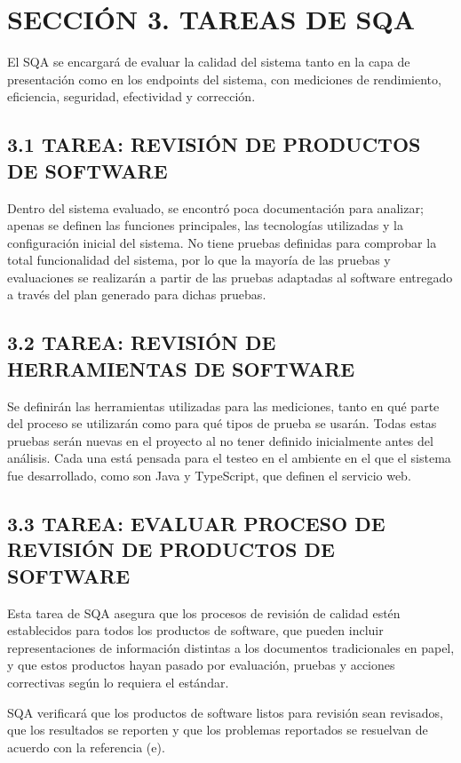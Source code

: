 ﻿\section{SECCIÓN 3. TAREAS DE SQA}
El SQA se encargará de evaluar la calidad del sistema tanto en la capa de presentación como en los endpoints del sistema, con mediciones de rendimiento, eficiencia, seguridad, efectividad y corrección.

\subsection{3.1 TAREA: REVISIÓN DE PRODUCTOS DE SOFTWARE}
Dentro del sistema evaluado, se encontró poca documentación para analizar; apenas se definen las funciones principales, las tecnologías utilizadas y la configuración inicial del sistema. No tiene pruebas definidas para comprobar la total funcionalidad del sistema, por lo que la mayoría de las pruebas y evaluaciones se realizarán a partir de las pruebas adaptadas al software entregado a través del plan generado para dichas pruebas.

\subsection{3.2 TAREA: REVISIÓN DE HERRAMIENTAS DE SOFTWARE}
Se definirán las herramientas utilizadas para las mediciones, tanto en qué parte del proceso se utilizarán como para qué tipos de prueba se usarán. Todas estas pruebas serán nuevas en el proyecto al no tener definido inicialmente antes del análisis. Cada una está pensada para el testeo en el ambiente en el que el sistema fue desarrollado, como son Java y TypeScript, que definen el servicio web.

\subsection{3.3 TAREA: EVALUAR PROCESO DE REVISIÓN DE PRODUCTOS DE SOFTWARE}
Esta tarea de SQA asegura que los procesos de revisión de calidad estén establecidos para todos los productos de software, que pueden incluir representaciones de información distintas a los documentos tradicionales en papel, y que estos productos hayan pasado por evaluación, pruebas y acciones correctivas según lo requiera el estándar.

SQA verificará que los productos de software listos para revisión sean revisados, que los resultados se reporten y que los problemas reportados se resuelvan de acuerdo con la referencia (e).

